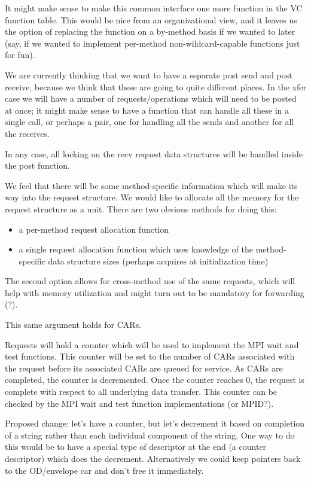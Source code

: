 \documentclass[11pt,letterpaper]{article}
\begin{document}
It might make sense to make this common interface one more function in the VC
function table.  This would be nice from an organizational view, and it leaves
us the option of replacing the function on a by-method basis if we wanted to
later (say, if we wanted to implement per-method non-wildcard-capable functions
just for fun).

We are currently thinking that we want to have a separate post send and post
receive, because we think that these are going to quite different places.  In
the xfer case we will have a number of requests/operations which will need to
be posted at once; it might make sense to have a function that can handle all
these in a single call, or perhaps a pair, one for handling all the sends and
another for all the receives.

In any case, all locking on the recv request data structures will be handled
inside the post function.

We feel that there will be some method-specific information which will make its
way into the request structure.  We would like to allocate all the memory for the request structure as a unit.  There are two obvious methods for doing this:
\begin{itemize}
\item a per-method request allocation function
\item a single request allocation function which uses knowledge of the
  method-specific data structure sizes (perhaps acquires at initialization
  time)
\end{itemize}
The second option allows for cross-method use of the same requests, which will
help with memory utilization and might turn out to be mandatory for forwarding
(?).

This same argument holds for CARs.

Requests will hold a counter which will be used to implement the MPI wait and
test functions.  This counter will be set to the number of CARs associated with
the request before its associated CARs are queued for service.  As CARs are
completed, the counter is decremented.  Once the counter reaches 0, the request
is complete with respect to all underlying data transfer.  This counter can be
checked by the MPI wait and test function implementations (or MPID?).

Proposed change: let's have a counter, but let's decrement it based on
completion of a string rather than each individual component of the string.
One way to do this would be to have a special type of descriptor at the end (a
counter descriptor) which does the decrement.  Alternatively we could keep
pointers back to the OD/envelope car and don't free it immediately.
\end{document}
